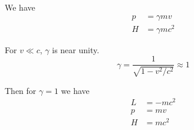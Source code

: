


\bigskip
We have
\begin{align*}
p&=\gamma mv
\tag{5.23}
\\
H&=\gamma mc^2
\tag{5.24}
\end{align*}

For $v\ll c$, $\gamma$ is near unity.
\begin{equation*}
\gamma=\frac{1}{\sqrt{1-v^2/c^2}}\approx1
\end{equation*}

Then for $\gamma=1$ we have
\begin{align*}
L&=-mc^2
\\
p&=mv
\\
H&=mc^2
\end{align*}




